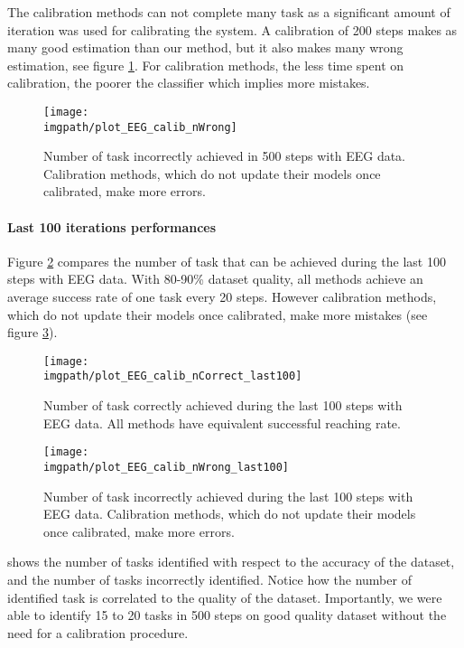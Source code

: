 The calibration methods can not complete many task as a significant amount of iteration was used for calibrating the system. A calibration of 200 steps makes as many good estimation than our method, but it also makes many wrong estimation, see figure \ref{fig:nWrongEEG}. For calibration methods, the less time spent on calibration, the poorer the classifier which implies more mistakes.

\begin{figure}[!h]
\centering
\texttt{[image: \\imgpath/plot\_EEG\_calib\_nWrong]}
\caption{Number of task incorrectly achieved in 500 steps with EEG data. Calibration methods, which do not update their models once calibrated, make more errors.}
\label{fig:nWrongEEG}
\end{figure}

\paragraph{Last 100 iterations performances}

Figure \ref{fig:nCorrectEEG_last100} compares the number of task that can be achieved during the last 100 steps with EEG data. With 80-90\% dataset quality, all methods achieve an average success rate of one task every 20 steps. However calibration methods, which do not update their models once calibrated, make more mistakes (see figure \ref{fig:nWrongEEG_last100}).

\begin{figure}[!h]
\centering
\texttt{[image: \\imgpath/plot\_EEG\_calib\_nCorrect\_last100]}
\caption{Number of task correctly achieved during the last 100 steps with EEG data. All methods have equivalent successful reaching rate.}
\label{fig:nCorrectEEG_last100}
\end{figure} 

\begin{figure}[!h]
\centering
\texttt{[image: \\imgpath/plot\_EEG\_calib\_nWrong\_last100]}
\caption{Number of task incorrectly achieved during the last 100 steps with EEG data. Calibration methods, which do not update their models once calibrated, make more errors.}
\label{fig:nWrongEEG_last100}
\end{figure} 

 shows the number of tasks identified with respect to the accuracy of the dataset, and the number of tasks incorrectly identified. Notice how the number of identified task is correlated to the quality of the dataset. Importantly, we were able to identify 15 to 20 tasks in 500 steps on good quality dataset without the need for a calibration procedure.


